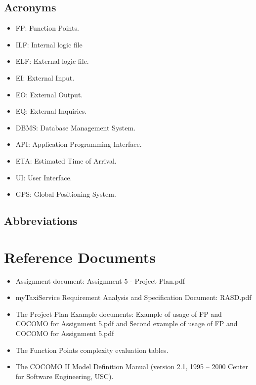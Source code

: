 \subsection{Acronyms}
\begin{itemize}
	\item FP: Function Points.
	\item ILF: Internal logic file
	\item ELF: External logic file.
	\item EI: External Input.
	\item EO: External Output.
	\item EQ: External Inquiries.
	\item DBMS: Database Management System.
	\item API: Application Programming Interface.
	\item ETA: Estimated Time of Arrival.
	\item UI: User Interface.
	\item GPS: Global Positioning System.
\end{itemize}
\subsection{Abbreviations}
\section{Reference Documents}
\begin{itemize}
	\item Assignment document: Assignment 5 - Project Plan.pdf
	\item myTaxiService Requirement Analysis and Specification Document: RASD.pdf
	\item The Project Plan Example documents: Example of usage of FP and COCOMO for Assignment 5.pdf and Second example of usage of FP and COCOMO for Assignment 5.pdf
	\item The Function Points complexity evaluation tables.
	\item The COCOMO II Model Definition Manual (version 2.1,  1995 – 2000 Center for Software Engineering, USC).
\end{itemize} 